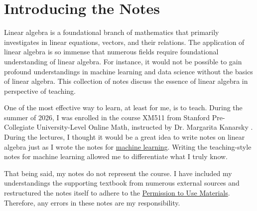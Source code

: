 \documentclass[../../main.tex]{subfiles}
\begin{document}
\chapter*{Introducing the Notes}

Linear algebra is a foundational branch of mathematics that
primarily investigates in linear equations, vectors, and their
relations. The application of linear algebra is so immense that
numerous fields require foundational understanding of linear
algebra. For instance, it would not be possible to gain
profound understandings in machine learning and data science
without the basics of linear algebra. This collection of notes
discuss the essence of linear algebra in perspective of teaching.

One of the most effective way to learn, at least for me, is to
teach. During the summer of 2026, I was enrolled in the course
XM511 from Stanford Pre-Collegiate University-Level Online Math,
instructed by Dr. Margarita Kanarsky \cite{MATH02-1}. During the
lectures, I thought it would be a great idea to write notes on linear
algebra just as I wrote the notes for
\href{https://github.com/enochyu-official/LibreNotebook}{machine learning}.
Writing the teaching-style notes for machine learning allowed
me to differentiate what I truly know.

That being said, my notes do not represent the course. I have
included my understandings the supporting textbook \cite{MATH02-2}
from numerous external sources and restructured the notes itself to
adhere to the \href{https://www.stanford.edu/site/terms/}{Permission
to Use Materials}. Therefore, any errors in these notes are my
responsibility.
\end{document}
